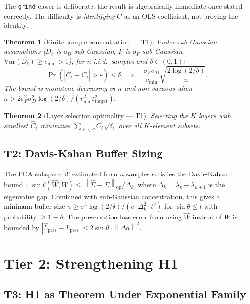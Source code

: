 \documentclass[11pt,a4paper]{article}
\newtheorem{theorem}{Theorem}[section]
\theoremstyle{definition}
\newcommand{\Var}{\mathrm{Var}}
\newcommand{\norm}[1]{\left\|#1\right\|}
\newcommand{\abs}[1]{\left|#1\right|}
\begin{document}
The \texttt{grind} closer is deliberate: the result is algebraically immediate once stated correctly. The difficulty is \emph{identifying} $C$ as an OLS coefficient, not proving the identity.

\begin{theorem}[Finite-sample concentration --- T1]
\label{thm:concentration}
Under sub-Gaussian assumptions ($D_\ell$ is $\sigma_D$-sub-Gaussian, $F$ is $\sigma_F$-sub-Gaussian, $\Var(D_\ell) \geq v_{\min} > 0$), for $n$ i.i.d.\ samples and $\delta \in (0,1)$:
\[
\Pr\!\left(\abs{\hat{C}_\ell - C_\ell} > \varepsilon\right) \leq \delta, \quad \varepsilon = \frac{\sigma_F \sigma_D}{v_{\min}} \sqrt{\frac{2\log(2/\delta)}{n}}.
\]
The bound is monotone decreasing in $n$ and non-vacuous when $n > 2\sigma_F^2 \sigma_D^2 \log(2/\delta) / (v_{\min}^2 \varepsilon_{\mathrm{target}}^2)$.
\end{theorem}

\begin{theorem}[Layer selection optimality --- T1]
\label{thm:layer-select}
Selecting the $K$ layers with smallest $\hat{C}_\ell$ minimizes $\sum_{\ell \in S} C_\ell \sqrt{\delta_\ell}$ over all $K$-element subsets.
\end{theorem}

\subsection{T2: Davis-Kahan Buffer Sizing}

The PCA subspace $\hat{W}$ estimated from $n$ samples satisfies the Davis-Kahan bound~\citep{daviskahan1970}: $\sin\theta(\hat{W}, W) \leq \norm{\hat{\Sigma} - \Sigma}_{\mathrm{op}} / \Delta_k$, where $\Delta_k = \lambda_k - \lambda_{k+1}$ is the eigenvalue gap. Combined with sub-Gaussian concentration, this gives a minimum buffer size $n \geq \sigma^4 \log(2/\delta) / (c \cdot \Delta_k^2 \cdot t^2)$ for $\sin\theta \leq t$ with probability $\geq 1-\delta$. The preservation loss error from using $\hat{W}$ instead of $W$ is bounded by $\abs{\hat{L}_{\mathrm{pres}} - L_{\mathrm{pres}}} \leq 2\sin\theta \cdot \norm{\Delta a}^2$.

\section{Tier 2: Strengthening H1}
\label{sec:tier2}

\subsection{T3: H1 as Theorem Under Exponential Family}
\end{document}
